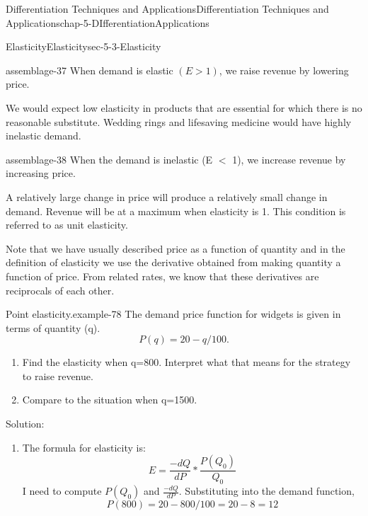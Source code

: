 \documentclass[oneside,10pt,]{book}
\numberwithin{equation}{section}
\newcommand{\lt}{<}
\newcommand{\gt}{>}
\begin{document}
\begin{chapterptx}{Differentiation Techniques and Applications}{}{Differentiation Techniques and Applications}{}{}{chap-5-DIfferentiationApplications}
\begin{sectionptx}{Elasticity}{}{Elasticity}{}{}{sec-5-3-Elasticity}
\begin{assemblage}{}{assemblage-37}
\hypertarget{p-2030}{}%
When demand is elastic \((E \gt 1)\), we raise revenue by lowering price.%
\end{assemblage}
\hypertarget{p-2031}{}%
We would expect low elasticity in products that are essential for which there is no reasonable substitute.  Wedding rings and lifesaving medicine would have highly inelastic demand.%
\begin{assemblage}{}{assemblage-38}%
\hypertarget{p-2032}{}%
When the demand is inelastic (E \(\lt\) 1), we increase revenue by increasing price.%
\end{assemblage}
\hypertarget{p-2033}{}%
A relatively large change in price will produce a relatively small change in demand. Revenue will be at a maximum when elasticity is 1.  This condition is referred to as unit elasticity.%
\par
\hypertarget{p-2034}{}%
Note that we have usually described price as a function of quantity and in the definition of elasticity we use the derivative obtained from making quantity a function of price.  From related rates, we know that these derivatives are reciprocals of each other.%
\begin{example}{Point elasticity.}{example-78}%
\hypertarget{p-2035}{}%
The demand price function for widgets is given in terms of quantity (q).%
%
\begin{equation*}
P(q)=20-q/100.
\end{equation*}
\leavevmode%
\begin{enumerate}[label=(\Alph*)]
\item\hypertarget{li-571}{}\hypertarget{p-2036}{}%
Find the elasticity when q=800.  Interpret what that means for the strategy to raise revenue.%
\item\hypertarget{li-572}{}\hypertarget{p-2037}{}%
Compare to the situation when q=1500.%
\end{enumerate}
\hypertarget{p-2038}{}%
Solution:%
\leavevmode%
\begin{enumerate}[label=(\Alph*)]
\item\hypertarget{li-573}{}\hypertarget{p-2039}{}%
The formula for elasticity is:%
%
\begin{equation*}
E=\frac{-d Q}{d P}*\frac{P(Q_0 )}{Q_0} 
\end{equation*}
\hypertarget{p-2040}{}%
I need to compute \(P(Q_0 )\) and \(\frac{-d Q}{d P}\).  Substituting into the demand function,%
%
\begin{equation*}
P(800)=20-800/100=20-8=12
\end{equation*}
\hypertarget{p-2041}{}%

\end{enumerate}
\end{example}
\end{sectionptx}
\end{chapterptx}
\end{document}
